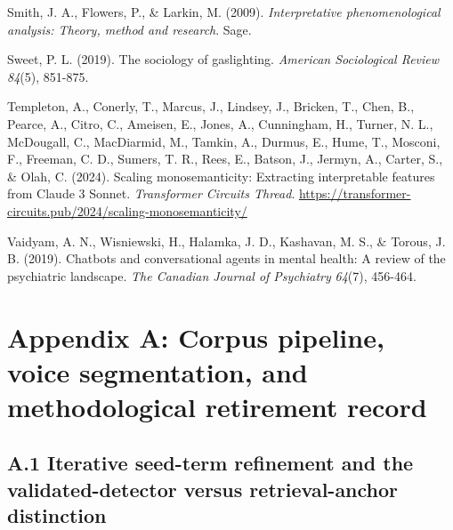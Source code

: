 \documentclass[11pt]{article}
\begin{document}
\hangindent=0.5in  Smith, J. A., Flowers, P., \& Larkin, M. (2009). \emph{Interpretative phenomenological analysis: Theory, method and research}. Sage.\par
\hangindent=0.5in  Sweet, P. L. (2019). The sociology of gaslighting. \emph{American Sociological Review} \emph{84}(5), 851-875.\par
\hangindent=0.5in  Templeton, A., Conerly, T., Marcus, J., Lindsey, J., Bricken, T., Chen, B., Pearce, A., Citro, C., Ameisen, E., Jones, A., Cunningham, H., Turner, N. L., McDougall, C., MacDiarmid, M., Tamkin, A., Durmus, E., Hume, T., Mosconi, F., Freeman, C. D., Sumers, T. R., Rees, E., Batson, J., Jermyn, A., Carter, S., \& Olah, C. (2024). Scaling monosemanticity: Extracting interpretable features from Claude 3 Sonnet. \emph{Transformer Circuits Thread}. \url{https://transformer-circuits.pub/2024/scaling-monosemanticity/}\par
\hangindent=0.5in  Vaidyam, A. N., Wisniewski, H., Halamka, J. D., Kashavan, M. S., \& Torous, J. B. (2019). Chatbots and conversational agents in mental health: A review of the psychiatric landscape. \emph{The Canadian Journal of Psychiatry} \emph{64}(7), 456-464.\par

\newpage
\section*{Appendix A: Corpus pipeline, voice segmentation, and methodological retirement record}

\subsection*{A.1 Iterative seed-term refinement and the validated-detector versus retrieval-anchor distinction}
\end{document}
